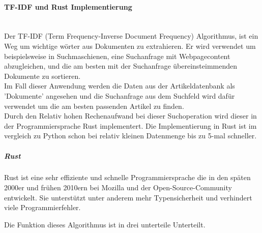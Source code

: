 \paragraph{TF-IDF und Rust Implementierung} \hspace{0pt} \\
Der TF-IDF (Term Frequency-Inverse Document Frequency) Algorithmus, ist ein Weg um wichtige wörter aus Dokumenten zu extrahieren. Er wird verwendet um beispielsweise in Suchmaschienen, eine Suchanfrage mit Webpagecontent abzugleichen, und die am besten mit der Suchanfrage übereinsteimmenden Dokumente zu sortieren. \\
Im Fall dieser Anwendung werden die Daten aus der Artikeldatenbank als 'Dokumente'  angesehen und die Suchanfrage aus dem Suchfeld wird dafür verwendet um die am besten passenden Artikel zu finden.
\\
Durch den Relativ hohen Rechenaufwand bei dieser Suchoperation wird dieser in der Programmiersprache Rust implementert. Die Implementierung in Rust ist im vergleich zu Python schon bei relativ kleinen Datenmenge bis zu 5-mal schneller.

\subparagraph{Rust}
Rust ist eine sehr effiziente und schnelle Programmiersprache die in den späten 2000er und frühen 2010ern bei Mozilla und der Open-Source-Community entwickelt. Sie unterstützt unter anderem mehr Typensicherheit und verhindert viele Programmierfehler. 

Die Funktion dieses Algorithmus ist in drei unterteile Unterteilt.

